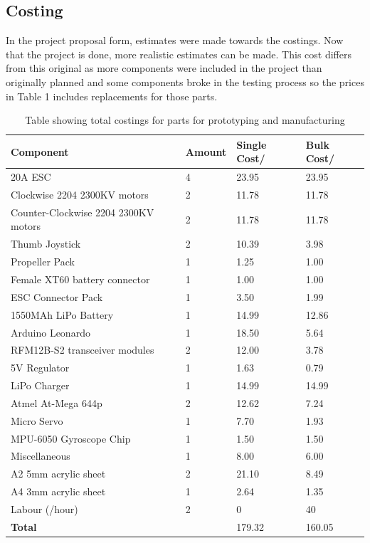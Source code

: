 \documentclass[a4paper,11pt]{article}
\begin{document}
\subsection{Costing}
In the project proposal form, estimates were made towards the costings. Now that the project is done, more realistic estimates can be made. This cost differs from this original as more components were included in the project than originally planned and some components broke in the testing process so the prices in Table 1 includes replacements for those parts.
\begin{table}[htp]
\begin{tabular}{|l|l|l|l|}
	\hline
	Component & Amount & Single Cost/\textsterling & Bulk Cost/\textsterling  \\
	\hline
	20A ESC & 4 & 23.95 & 23.95\\
	\hline
	Clockwise 2204 2300KV motors & 2 & 11.78 & 11.78\\
	\hline
    Counter-Clockwise 2204 2300KV motors & 2 & 11.78 & 11.78\\
	\hline
    Thumb Joystick & 2 & 10.39 & 3.98\\
	\hline
	Propeller Pack & 1 & 1.25 & 1.00\\
	\hline
	Female XT60 battery connector & 1 & 1.00 & 1.00\\
	\hline
	ESC Connector Pack & 1 & 3.50 & 1.99\\
	\hline
	1550MAh LiPo Battery & 1 & 14.99 & 12.86\\
	\hline    
	Arduino Leonardo & 1 & 18.50 & 5.64\\
	\hline
	RFM12B-S2 transceiver modules & 2 & 12.00 & 3.78\\
	\hline
	5V Regulator & 1 & 1.63 & 0.79\\
	\hline
	LiPo Charger & 1 & 14.99 & 14.99\\
	\hline
	Atmel At-Mega 644p & 2 & 12.62 & 7.24 \\ 
	\hline
	Micro Servo & 1 & 7.70 & 1.93\\ 
	\hline
	MPU-6050 Gyroscope Chip & 1 & 1.50 & 1.50 \\ 
	\hline
	Miscellaneous  & 1 & 8.00 & 6.00\\ 
	\hline
	A2 5mm acrylic sheet  & 2 & 21.10 & 8.49 \\ 
	\hline
	A4 3mm acrylic sheet  & 1 & 2.64 & 1.35\\ 
	\hline
    Labour (\textsterling20/hour)  & 2 & 0 & 40\\ 
	\hline
	\textbf{Total}& &179.32&160.05\\
	\hline
\end{tabular}
\caption{Table showing total costings for parts for prototyping and manufacturing}
\end{table}
\end{document}
